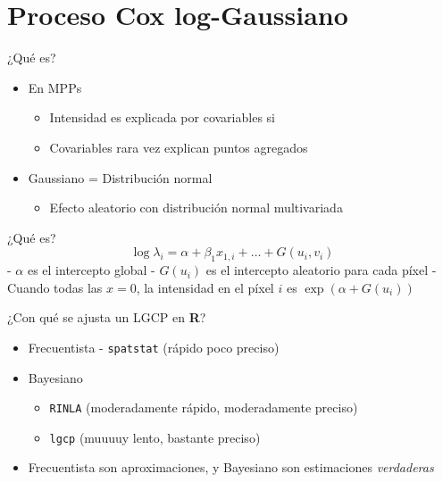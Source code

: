 \documentclass[
  11pt,
  ignorenonframetext,
]{beamer}
\providecommand{\tightlist}{%
  \setlength{\itemsep}{0pt}\setlength{\parskip}{0pt}}
\begin{document}
\hypertarget{proceso-cox-log-gaussiano}{%
\section{Proceso Cox log-Gaussiano}\label{proceso-cox-log-gaussiano}}

\begin{frame}{¿Qué es?}
\protect\hypertarget{quuxe9-es}{}
\begin{itemize}
\item
  En MPPs

  \begin{itemize}
  \tightlist
  \item
    Intensidad es explicada por covariables si
  \item
    Covariables rara vez explican puntos agregados
  \end{itemize}
\item
  Gaussiano = Distribución normal

  \begin{itemize}
  \tightlist
  \item
    Efecto aleatorio con distribución normal multivariada
  \end{itemize}
\end{itemize}
\end{frame}

\begin{frame}{¿Qué es?}
\protect\hypertarget{quuxe9-es-1}{}
\[\log \lambda_i = \alpha + \beta_1 x_{1,i} + \dots + G(u_i, v_i)\] -
\(\alpha\) es el intercepto global - \(G(u_i)\) es el intercepto
aleatorio para cada píxel - Cuando todas las \(x = 0\), la intensidad en
el píxel \(i\) es \(\exp(\alpha + G(u_i))\)
\end{frame}

\begin{frame}[fragile]{¿Con qué se ajusta un LGCP en \textbf{R}?}
\protect\hypertarget{con-quuxe9-se-ajusta-un-lgcp-en-r}{}
\begin{itemize}
\item
  Frecuentista - \texttt{spatstat} (rápido poco preciso)
\item
  Bayesiano

  \begin{itemize}
  \tightlist
  \item
    \texttt{RINLA} (moderadamente rápido, moderadamente preciso)
  \item
    \texttt{lgcp} (muuuuy lento, bastante preciso)
  \end{itemize}
\item
  Frecuentista son aproximaciones, y Bayesiano son estimaciones
  \emph{verdaderas}
\end{itemize}
\end{frame}
\end{document}
